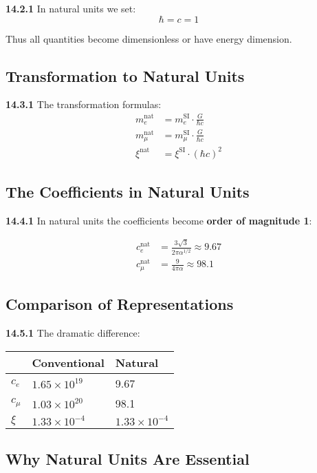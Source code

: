\documentclass[12pt,a4paper]{article}
\begin{document}
\noindent \textbf{14.2.1} In natural units we set:
\[
\hbar = c = 1
\]

Thus all quantities become dimensionless or have energy dimension.

\subsection{Transformation to Natural Units}

\noindent \textbf{14.3.1} The transformation formulas:
\begin{align*}
	m_e^{\text{nat}} &= m_e^{\text{SI}} \cdot \frac{G}{\hbar c} \\
	m_\mu^{\text{nat}} &= m_\mu^{\text{SI}} \cdot \frac{G}{\hbar c} \\
	\xi^{\text{nat}} &= \xi^{\text{SI}} \cdot (\hbar c)^2
\end{align*}

\subsection{The Coefficients in Natural Units}

\noindent \textbf{14.4.1} In natural units the coefficients become \textbf{order of magnitude 1}:

\begin{align*}
	c_e^{\text{nat}} &= \frac{3\sqrt{3}}{2\pi\alpha^{1/2}} \approx 9.67 \\
	c_\mu^{\text{nat}} &= \frac{9}{4\pi\alpha} \approx 98.1
\end{align*}

\subsection{Comparison of Representations}

\noindent \textbf{14.5.1} The dramatic difference:

\begin{tabular}{lll}
	& Conventional & Natural \\
	\midrule
	$c_e$ & $1.65 \times 10^{19}$ & 9.67 \\
	$c_\mu$ & $1.03 \times 10^{20}$ & 98.1 \\
	$\xi$ & $1.33 \times 10^{-4}$ & $1.33 \times 10^{-4}$ \\
\end{tabular}

\subsection{Why Natural Units Are Essential}
\end{document}
